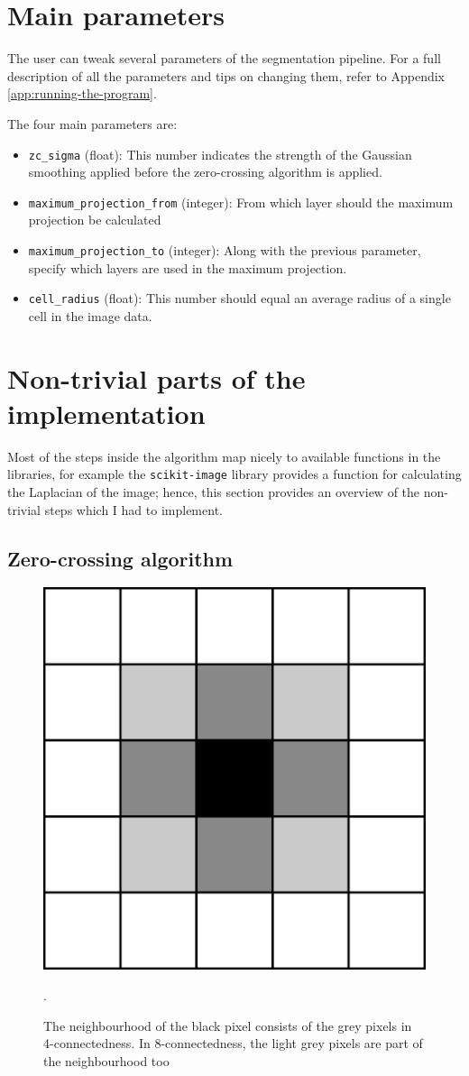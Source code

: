 \documentclass[
  digital,     %
  oneside,     %
  nosansbold,  %
  nocolorbold, %
  lof,         %
  lot,         %
]{fithesis4}
\begin{document}
\section{Main parameters}
The user can tweak several parameters of the segmentation pipeline. For a full description of all
the parameters and tips on changing them, refer to Appendix \ref{app:running-the-program}.

The four main parameters are:
\begin{itemize}
    \item \texttt{zc\_sigma} (float): This number indicates the strength of the Gaussian smoothing
    applied before the zero-crossing algorithm is applied.
    \item \texttt{maximum\_projection\_from} (integer): From which layer should the maximum projection
    be calculated
    \item \texttt{maximum\_projection\_to} (integer): Along with the previous parameter, specify which layers are used in the maximum projection.
    \item \texttt{cell\_radius} (float): This number should equal an average radius of a single cell in
    the image data.
\end{itemize}

\section{Non-trivial parts of the implementation}
Most of the steps inside the algorithm map nicely to available functions in the
libraries, for example the \texttt{scikit-image} library provides a function for
calculating the Laplacian of the image; hence, this section provides an overview of
the non-trivial steps which I had to implement.

\subsection{Zero-crossing algorithm}

\begin{figure}
    \begin{center}
        \includegraphics[width=0.3\linewidth]{resources/neighbourhood.png}
    \end{center}
    \caption{The neighbourhood of the black pixel consists of the grey pixels in
    4-connectedness. In 8-connectedness, the light grey pixels are part of the
    neighbourhood too}.
    \label{fig:neighbourhood}
\end{figure}
\end{document}
